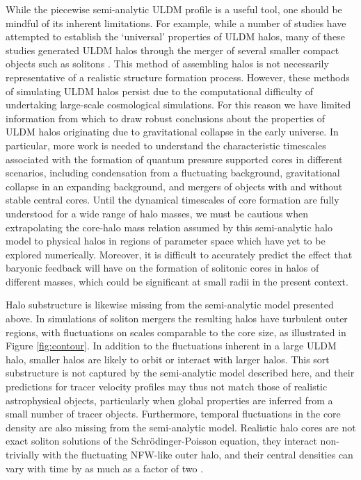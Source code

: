 \documentclass{pasa}%
\begin{document}
While the piecewise semi-analytic ULDM profile is a useful tool, one should be mindful of its inherent limitations. For example, while a number of studies have attempted to establish the `universal' properties of ULDM halos, many of these studies generated ULDM halos through the merger of several smaller compact objects such as solitons \cite{Schwabe:2016rze, Mocz:2017wlg}. This method of assembling halos is not necessarily representative of a realistic structure formation process. However, these methods of simulating ULDM halos persist due to the computational difficulty of undertaking large-scale cosmological simulations. For this reason we have limited information from which to draw robust conclusions about the properties of ULDM halos originating due to gravitational collapse in the early universe. In particular, more work is needed to understand the characteristic timescales associated with the formation of quantum pressure supported cores in different scenarios, including condensation from a fluctuating background, gravitational collapse in an expanding background, and mergers of objects with and without stable central cores. Until the dynamical timescales of core formation are fully understood for  a wide range of halo masses, we must be cautious when extrapolating the core-halo mass relation assumed by this semi-analytic halo model to physical halos in regions of parameter space which have yet to be explored numerically. Moreover, it is difficult to accurately predict the effect that baryonic feedback will have on the formation of solitonic cores in halos of different masses, which could be significant at small radii in the  present context.

Halo substructure is likewise missing from the semi-analytic model presented above. In simulations of soliton mergers the resulting halos have turbulent outer regions, with fluctuations on scales comparable to the core size, as illustrated in Figure \ref{fig:contour}. In addition to the fluctuations inherent in a large ULDM halo, smaller halos are likely to orbit or interact with larger halos. This sort  substructure is not captured by the semi-analytic model described here, and their predictions for tracer velocity profiles may thus not match those of realistic astrophysical objects, particularly when global properties are inferred from a small number of tracer objects. Furthermore, temporal fluctuations in the core density are also missing from the semi-analytic model. Realistic halo cores are not exact soliton solutions of the Schr\"{o}dinger-Poisson equation,  they interact non-trivially with the fluctuating NFW-like outer halo, and their central densities can vary with time by as much as a factor of two \cite{Veltmaat:2018dfz}.
\end{document}
